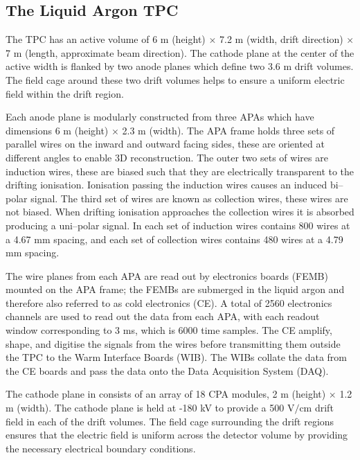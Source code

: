 \subsection{The Liquid Argon TPC}

The \protodune{} TPC has an active volume of 6 m (height) $\times$ 7.2 m (width,
drift direction) $\times$ 7 m (length, approximate beam direction). The cathode 
plane at the center of the active width is flanked by two anode planes which 
define two 3.6 m drift volumes. The field cage around these two drift volumes
helps to ensure a uniform electric field within the drift region.

Each anode plane is modularly constructed from three APAs which have dimensions
6 m (height) $\times$ 2.3 m (width). The APA frame holds three sets of parallel
wires on the inward and outward facing sides, these are oriented at different 
angles to enable 3D reconstruction. The outer two sets of wires are induction
wires, these are biased such that they are electrically transparent to the 
drifting ionisation. Ionisation passing the induction wires causes an induced 
bi--polar signal. The third set of wires are known as collection wires, these
wires are not biased. When drifting ionisation approaches the collection wires 
it is absorbed producing a uni--polar signal. In \protodune{} each set of 
induction wires contains 800 wires at a 4.67 mm spacing, and each set of 
collection wires contains 480 wires at a 4.79 mm spacing. 

The wire planes from each APA are read out by electronics boards (FEMB) 
mounted on the APA frame; the FEMBs are submerged in the liquid argon 
and therefore also referred to as cold electronics (CE). A total of 2560 
electronics channels are used to read out the data from each APA, with each
readout window corresponding to 3 ms, which is 6000 time samples. The CE 
amplify, shape, and digitise the signals from the wires before transmitting 
them outside the TPC to the Warm Interface Boards (WIB). The WIBs collate the 
data from the CE boards and pass the data onto the Data Acquisition System 
(DAQ).

The cathode plane in \protodune{} consists of an array of 18 CPA modules, 2 m 
(height) $\times$ 1.2 m (width). The cathode plane is held at -180 kV to 
provide a 500 $\mbox{V/cm}$ drift field in each of the drift volumes. The 
field cage surrounding the drift regions ensures that the electric field is 
uniform across the detector volume by providing the necessary electrical
boundary conditions.

